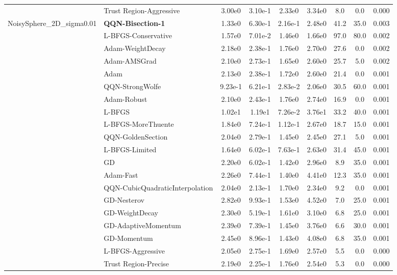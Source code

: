 \documentclass[10pt]{article}
\begin{document}
\begin{longtable}{|l|l|c|c|c|c|c|c|c|}
\hline
 & Trust Region-Aggressive & 3.00e0 & 3.10e-1 & 2.33e0 & 3.34e0 & 8.0 & 0.0 & 0.000 \\
NoisySphere\_2D\_sigma0.01 & \textbf{QQN-Bisection-1} & 1.33e0 & 6.30e-1 & 2.16e-1 & 2.48e0 & 41.2 & 35.0 & 0.003 \\
\hline
 & L-BFGS-Conservative & 1.57e0 & 7.01e-2 & 1.46e0 & 1.66e0 & 97.0 & 80.0 & 0.002 \\
\hline
 & Adam-WeightDecay & 2.18e0 & 2.38e-1 & 1.76e0 & 2.70e0 & 27.6 & 0.0 & 0.002 \\
\hline
 & Adam-AMSGrad & 2.10e0 & 2.73e-1 & 1.65e0 & 2.60e0 & 25.7 & 5.0 & 0.002 \\
\hline
 & Adam & 2.13e0 & 2.38e-1 & 1.72e0 & 2.60e0 & 21.4 & 0.0 & 0.001 \\
\hline
 & QQN-StrongWolfe & 9.23e-1 & 6.21e-1 & 2.83e-2 & 2.06e0 & 30.5 & 60.0 & 0.001 \\
\hline
 & Adam-Robust & 2.10e0 & 2.43e-1 & 1.76e0 & 2.74e0 & 16.9 & 0.0 & 0.001 \\
\hline
 & L-BFGS & 1.02e1 & 1.19e1 & 7.26e-2 & 3.76e1 & 33.2 & 40.0 & 0.001 \\
\hline
 & L-BFGS-MoreThuente & 1.84e0 & 7.24e-1 & 1.12e-1 & 2.67e0 & 18.7 & 15.0 & 0.001 \\
\hline
 & QQN-GoldenSection & 2.04e0 & 2.79e-1 & 1.45e0 & 2.45e0 & 27.1 & 5.0 & 0.001 \\
\hline
 & L-BFGS-Limited & 1.64e0 & 6.02e-1 & 7.63e-1 & 2.63e0 & 31.4 & 45.0 & 0.001 \\
\hline
 & GD & 2.20e0 & 6.02e-1 & 1.42e0 & 2.96e0 & 8.9 & 35.0 & 0.001 \\
\hline
 & Adam-Fast & 2.26e0 & 7.44e-1 & 1.40e0 & 4.41e0 & 12.3 & 35.0 & 0.001 \\
\hline
 & QQN-CubicQuadraticInterpolation & 2.04e0 & 2.13e-1 & 1.70e0 & 2.34e0 & 9.2 & 0.0 & 0.001 \\
\hline
 & GD-Nesterov & 2.82e0 & 9.93e-1 & 1.53e0 & 4.52e0 & 7.0 & 25.0 & 0.001 \\
\hline
 & GD-WeightDecay & 2.30e0 & 5.19e-1 & 1.61e0 & 3.10e0 & 6.8 & 25.0 & 0.001 \\
\hline
 & GD-AdaptiveMomentum & 2.39e0 & 7.39e-1 & 1.45e0 & 3.76e0 & 6.6 & 30.0 & 0.001 \\
\hline
 & GD-Momentum & 2.45e0 & 8.96e-1 & 1.43e0 & 4.08e0 & 6.8 & 35.0 & 0.001 \\
\hline
 & L-BFGS-Aggressive & 2.05e0 & 2.75e-1 & 1.69e0 & 2.57e0 & 5.5 & 0.0 & 0.000 \\
\hline
 & Trust Region-Precise & 2.19e0 & 2.25e-1 & 1.76e0 & 2.54e0 & 5.3 & 0.0 & 0.000 \\

\end{longtable}
\end{document}
